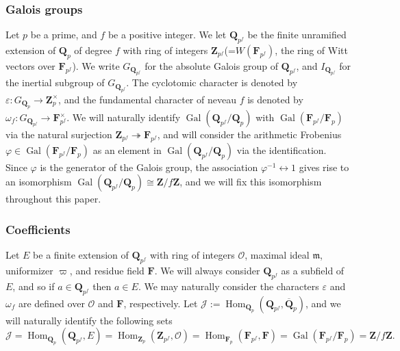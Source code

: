 \documentclass[11pt]{amsart}
\theoremstyle{definition}
\numberwithin{equation}{subsection}
\theoremstyle{plain}
\theoremstyle{plain}
\theoremstyle{plain}
\theoremstyle{plain}
\theoremstyle{plain}
\theoremstyle{plain}
\theoremstyle{plain}
\theoremstyle{plain}
\theoremstyle{plain}
\theoremstyle{plain}
\theoremstyle{plain}
\theoremstyle{plain}
\theoremstyle{definition}
\theoremstyle{definition}
\theoremstyle{definition}
\theoremstyle{remark}
\renewcommand{\(}{\textup{(}}
\renewcommand{\)}{\textup{)}}
\DeclareMathOperator{\Gal}{Gal}
\DeclareMathOperator{\Hom}{Hom}
\newcommand{\Q}{\mathbf{Q}}
\newcommand{\Z}{\mathbf{Z}}
\newcommand{\F}{\mathbf{F}}
\newcommand{\fm}{\mathfrak{m}}
\newcommand{\cO}{\mathcal{O}}
\newcommand{\cJ}{\mathcal{J}}
\begin{document}
\subsubsection{Galois groups}
Let $p$ be a prime, and $f$ be a positive integer. We let $\Q_{p^f}$ be the finite unramified extension of $\Q_p$ of degree $f$ with ring of integers $\Z_{p^f}$(=$W(\F_{p^f})$, the ring of Witt vectors over $\F_{p^f}$). We write $G_{\Q_{p^f}}$ for the absolute Galois group of $\Q_{p^f}$, and $I_{\Q_{p^f}}$ for the inertial subgroup of $G_{\Q_{p^f}}$. The cyclotomic character is denoted by $\varepsilon:G_{\Q_p}\rightarrow \Z_p^{\times}$, and the fundamental character of neveau $f$ is denoted by $\omega_f:G_{\Q_{p^f}}\rightarrow \F_{p^f}^\times$. We will naturally identify $\Gal(\Q_{p^f}/\Q_p)$ with $\Gal(\F_{p^f}/\F_p)$ via the natural surjection $\Z_{p^f}\twoheadrightarrow \F_{p^f}$, and will consider the arithmetic Frobenius $\varphi\in\Gal(\F_{p^f}/\F_p)$ as an element in $\Gal(\Q_{p^f}/\Q_p)$ via the identification. Since $\varphi$ is the generator of the Galois group, the association $\varphi^{-1}\leftrightarrow 1$ gives rise to an isomorphism $\Gal(\Q_{p^f}/\Q_p)\cong \Z/f\Z$, and we will fix this isomorphism throughout this paper.




\subsubsection{Coefficients}
Let $E$ be a finite extension of $\Q_{p^f}$ with ring of integers $\cO$, maximal ideal $\fm$, uniformizer $\varpi$, and residue field $\F$. We will always consider $\Q_{p^f}$ as a subfield of $E$, and so if $a\in\Q_{p^f}$ then $a\in E$. We may naturally consider the characters $\varepsilon$ and $\omega_f$ are defined over $\cO$ and $\F$, respectively. Let $\cJ:=\Hom_{\Q_p}(\Q_{p^f},\overline{\Q}_p)$, and we will naturally identify the following sets $$\cJ=\Hom_{\Q_p}(\Q_{p^f},E)=\Hom_{\Z_p}(\Z_{p^f},\cO)=\Hom_{\F_p}(\F_{p^f},\F)=\Gal(\F_{p^f}/\F_p)=\Z/f\Z.$$
\end{document}
